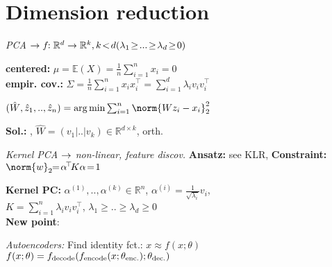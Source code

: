 \section{Dimension reduction}

\emph{PCA}
\enskip $\normalcolor
\to f\!\!: \mathbb{R}^d\to\mathbb{R}^k, k\!<\!d
\hfill (\lambda_1\!\geq\!...\!\geq\!\lambda_d\!\geq\!0)$

\textbf{centered:} $\mu = \mathbb{E}(X) = \frac{1}{n} \sum_{i=1}^n x_i = 0$\\
\textbf{empir. cov.:} $\Sigma = \frac{1}{n} \sum_{i=1}^n x_ix_i^\top = \sum_{i=1}^d \lambda_i v_iv_i^\top$

$(\hat W, \hat z_1, .., \hat z_n) = \arg\min \sum_{i=1}^n \norm{Wz_i - x_i}_2^2$

\textbf{Sol.:} , $\hat W = (v_1\vert..\vert v_k) \in \mathbb{R}^{d\times k}$, orth.

\emph{Kernel PCA \enskip
\normalfont\sffamily$\normalcolor\to$ non-linear, feature discov.}
\textbf{Ansatz:} {\small see KLR},\enskip
\textbf{Constraint:} $\norm{w}_2 \!\!=\! \alpha^{\!\top}\!K\alpha \!=\! 1$

\textbf{Kernel PC:} $\alpha^{(1)}\!,..,\alpha^{(k)}\!\in\!\mathbb{R}^n$, \enskip
$\alpha^{(i)} \!=\! \frac{1}{\sqrt{\lambda_i}}v_i$,\\
$K = \sum_{i=1}^n \lambda_i v_i v_i^\top$, $\lambda_1\!\geq\!..\!\geq\!\lambda_d\!\geq\!0$\\
\textbf{New point}: 

\emph{Autoencoders:}
Find identity fct.: $x \approx f(x;\theta)$\\
$f(x;\theta) = f_\mathrm{decode}(f_\mathrm{encode}(x;\theta_\mathrm{enc.});\theta_\mathrm{dec.})$
